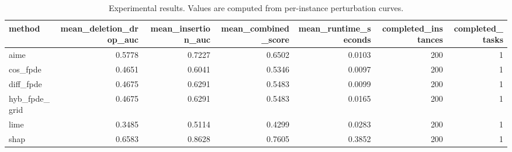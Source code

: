 \begin{table}[t]
\caption{Experimental results. Values are computed from per-instance perturbation curves.}
\label{tab:main_results_computed}
\centering
\begin{tabular}{lrrrrrr}
\toprule
method & mean\_deletion\_drop\_auc & mean\_insertion\_auc & mean\_combined\_score & mean\_runtime\_seconds & completed\_instances & completed\_tasks \\
\midrule
aime & 0.5778 & 0.7227 & 0.6502 & 0.0103 & 200 & 1 \\
cos\_fpde & 0.4651 & 0.6041 & 0.5346 & 0.0097 & 200 & 1 \\
diff\_fpde & 0.4675 & 0.6291 & 0.5483 & 0.0099 & 200 & 1 \\
hyb\_fpde\_grid & 0.4675 & 0.6291 & 0.5483 & 0.0165 & 200 & 1 \\
lime & 0.3485 & 0.5114 & 0.4299 & 0.0283 & 200 & 1 \\
shap & 0.6583 & 0.8628 & 0.7605 & 0.3852 & 200 & 1 \\
\bottomrule
\end{tabular}

\end{table}
